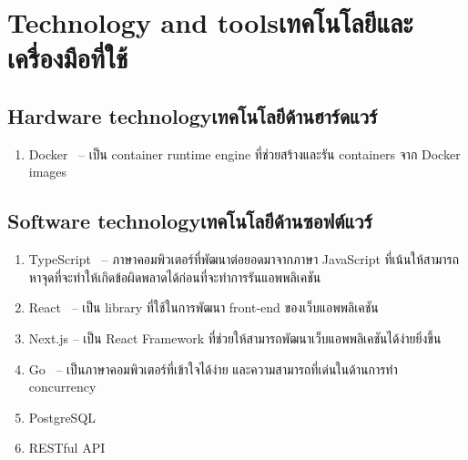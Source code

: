 \section{\ifenglish Technology and tools\else เทคโนโลยีและเครื่องมือที่ใช้\fi}

\subsection{\ifenglish Hardware technology\else เทคโนโลยีด้านฮาร์ดแวร์\fi}
\begin{enumerate}
    \item Docker~\cite{dke} -- เป็น container runtime engine ที่ช่วยสร้างและรัน containers จาก Docker images
\end{enumerate}

\subsection{\ifenglish Software technology\else เทคโนโลยีด้านซอฟต์แวร์\fi}
\begin{enumerate}
    \item TypeScript~\cite{typescript} -- ภาษาคอมพิวเตอร์ที่พัฒนาต่อยอดมาจากภาษา JavaScript
          ที่เน้นให้สามารถหาจุดที่จะทำให้เกิดข้อผิดพลาดได้ก่อนที่จะทำการรันแอพพลิเคชัน
    \item React~\cite{react} -- เป็น library ที่ใช้ในการพัฒนา front-end ของเว็บแอพพลิเคชัน
    \item Next.js\cite{nextjs} -- เป็น React Framework ที่ช่วยให้สามารถพัฒนาเว็บแอพพลิเคชันได้ง่ายยิ่งขึ้น
    \item Go~\cite{golang} -- เป็นภาษาคอมพิวเตอร์ที่เข้าใจได้ง่าย และความสามารถที่เด่นในด้านการทำ concurrency
    \item PostgreSQL
    \item RESTful API
\end{enumerate}

